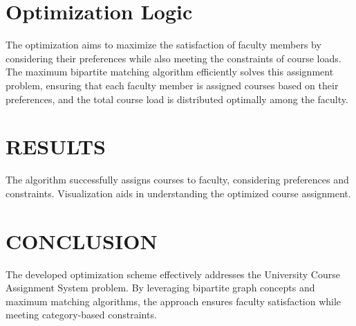 \documentclass[twoside]{article}
\begin{document}
\section*{Optimization Logic}

The optimization aims to maximize the satisfaction of faculty members by considering their preferences while also meeting the constraints of course loads. The maximum bipartite matching algorithm efficiently solves this assignment problem, ensuring that each faculty member is assigned courses based on their preferences, and the total course load is distributed optimally among the faculty.

\section*{RESULTS}

The algorithm successfully assigns courses to faculty, considering preferences and constraints. Visualization aids in understanding the optimized course assignment.

\lipsum[1-4]  %

\section*{CONCLUSION}

The developed optimization scheme effectively addresses the University Course Assignment System problem. By leveraging bipartite graph concepts and maximum matching algorithms, the approach ensures faculty satisfaction while meeting category-based constraints.
\end{document}
